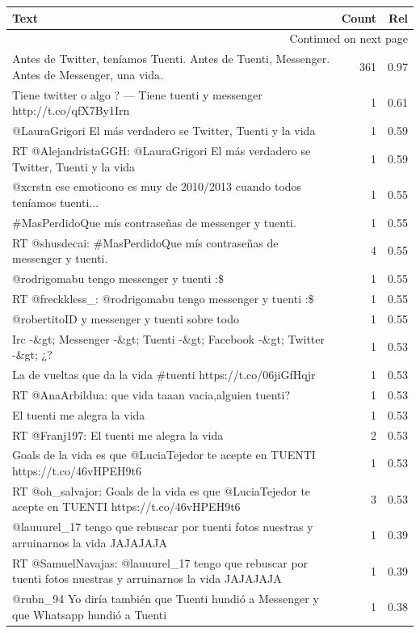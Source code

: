 \begin{longtable}{p{12.5cm}rr}
\toprule
Text & Count & Rel \\
\midrule
\endhead
\midrule
\multicolumn{3}{r}{{Continued on next page}} \\
\midrule
\endfoot

\bottomrule
\endlastfoot
Antes de Twitter, teníamos Tuenti. Antes de Tuenti, Messenger. Antes de Messenger, una vida. & 361 & 0.97 \\
Tiene twitter o algo ? — Tiene tuenti y messenger http://t.co/qfX7By1Irn & 1 & 0.61 \\
@LauraGrigori El más verdadero se Twitter, Tuenti y la vida & 1 & 0.59 \\
RT @AlejandristaGGH: @LauraGrigori El más verdadero se Twitter, Tuenti y la vida & 1 & 0.59 \\
@xcrstn ese emoticono es muy de 2010/2013 cuando todos teníamos tuenti... & 1 & 0.55 \\
\#MasPerdidoQue mís contraseñas de messenger y tuenti. & 1 & 0.55 \\
RT @shusdecai: \#MasPerdidoQue mís contraseñas de messenger y tuenti. & 4 & 0.55 \\
@rodrigomabu  tengo messenger y tuenti :\$ & 1 & 0.55 \\
RT @freckkless\_: @rodrigomabu  tengo messenger y tuenti :\$ & 1 & 0.55 \\
@robertitoID y messenger y tuenti sobre todo & 1 & 0.55 \\
Irc -\&gt; Messenger -\&gt; Tuenti -\&gt; Facebook -\&gt; Twitter -\&gt; ¿? & 1 & 0.53 \\
La de vueltas que da la vida \#tuenti https://t.co/06jiGfHqjr & 1 & 0.53 \\
RT @AnaArbildua: que vida taaan vacia,alguien tuenti? & 1 & 0.53 \\
El tuenti me alegra la vida & 1 & 0.53 \\
RT @Franj197: El tuenti me alegra la vida & 2 & 0.53 \\
Goals de la vida es que @LuciaTejedor te acepte en TUENTI https://t.co/46vHPEH9t6 & 1 & 0.53 \\
RT @oh\_salvajor: Goals de la vida es que @LuciaTejedor te acepte en TUENTI https://t.co/46vHPEH9t6 & 3 & 0.53 \\
@lauuurel\_17 tengo que rebuscar por tuenti fotos nuestras y arruinarnos la vida JAJAJAJA & 1 & 0.39 \\
RT @SamuelNavajas: @lauuurel\_17 tengo que rebuscar por tuenti fotos nuestras y arruinarnos la vida JAJAJAJA & 1 & 0.39 \\
@rubn\_94 Yo diría también que Tuenti hundió a Messenger y que Whatsapp hundió a Tuenti & 1 & 0.38 \\

\end{longtable}
\clearpage

